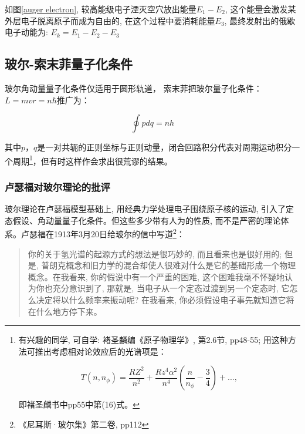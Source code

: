 如图\ref{auger electron}, 较高能级电子湮灭空穴放出能量$E_1 - E_2$,
这个能量会激发某外层电子脱离原子而成为自由的,
在这个过程中要消耗能量$E_3$, 最终发射出的俄歇电子动能为: $E_k = E_1
- E_2 - E_3$



\subsection{玻尔-索末菲量子化条件}


玻尔角动量量子化条件仅适用于圆形轨道，
索末菲把玻尔量子化条件：$L = mvr = n\hbar $推广为：

\begin{equation}\label{Sommerfeld Condition}
    \oint {pdq = nh}
\end{equation}

其中$p$，$q$是一对共轭的正则坐标与正则动量，闭合回路积分代表对周期运动积分一个周期\footnote{
有兴趣的同学, 可自学: 褚圣麟编《原子物理学》, 第2.6节, pp48-55;
用这种方法可推出考虑相对论效应后的光谱项是：

\begin{equation*}
T(n,n_{\phi})=\frac{RZ^2}{n^2}+\frac{Rz^4\alpha^2}{n^4}\left(
\frac{n}{n_{\phi}}-\frac{3}{4}\right)+...,
\end{equation*}

即褚圣麟书中pp55中第(16)式。

}，但有时这样作会求出很荒谬的结果。




\subsubsection*{卢瑟福对玻尔理论的批评}

玻尔理论在卢瑟福模型基础上, 用经典力学处理电子围绕原子核的运动,
引入了定态假设、角动量量子化条件。但这些多少带有人为的性质,
而不是严密的理论体系。卢瑟福在1913年3月20日给玻尔的信中写道\footnote{《尼耳斯·玻尔集》第二卷,
pp112}：


\begin{quote}
    你的关于氢光谱的起源方式的想法是很巧妙的, 而且看来也是很好用的;
    但是,
    普朗克概念和旧力学的混合却使人很难对什么是它的基础形成一个物理概念。在我看来,
    你的假说中有一个严重的困难,
    这个困难我毫不怀疑地认为你也充分意识到了, 那就是,
    当电子从一个定态过渡到另一个定态时,
    它怎么决定将以什么频率来振动呢? 在我看来,
    你必须假设电子事先就知道它将在什么地方停下来。
\end{quote}

